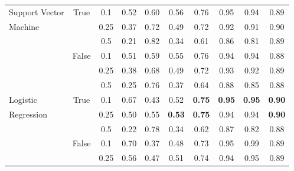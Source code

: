 \begin{table}[h!]
{\begin{tabular}{lccccccccc}
Support Vector     & True                   & 0.1           & 0.52               & 0.60            & 0.56         & 0.76          & 0.95             & 0.94         & 0.89             \\ 
Machine                           &                        & 0.25          & 0.37               & 0.72            & 0.49         & 0.72          & 0.92             & 0.91         & 0.90             \\ 
                           &                        & 0.5           & 0.21                 & 0.82              & 0.34           & 0.61            & 0.86               & 0.81           & 0.89               \\ 
                           & False                  & 0.1           & 0.51               & 0.59            & 0.55         & 0.76          & 0.94             & 0.94         & 0.88             \\ 
                           &                        & 0.25          & 0.38                 & 0.68              & 0.49           & 0.72            & 0.93               & 0.92           & 0.89               \\ 
                           &                        & 0.5           & 0.25                 & 0.76              & 0.37           & 0.64            & 0.88               & 0.85           & 0.88               \\ \hline
Logistic        & True                   & 0.1           & 0.67               & 0.43            & 0.52         & \textbf{0.75}          & \textbf{0.95}             & \textbf{0.95}         & \textbf{0.90}             \\ 
Regression                           &                        & 0.25          & 0.50               & 0.55            & \textbf{0.53}         & \textbf{0.75}          & 0.94             & 0.94         & \textbf{0.90}             \\ 
                           &                        & 0.5           & 0.22                 & 0.78              & 0.34           & 0.62            & 0.87               & 0.82           & 0.88               \\ 
                           & False                  & 0.1           & 0.70                 & 0.37              & 0.48           & 0.73            & 0.95               & 0.99           & 0.89               \\ 
                           &                        & 0.25          & 0.56                 & 0.47              & 0.51           & 0.74            & 0.94               & 0.95           & 0.89               \\ 

\end{tabular}}
\end{table}
